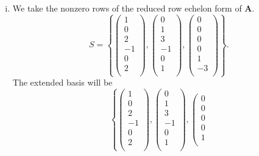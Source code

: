 \documentclass{article}
\newcommand{\bs}[1]{\boldsymbol{#1}}
\begin{document}
\begin{enumerate}[(i)]
    \item We take the nonzero rows of the reduced row echelon form of $\bs{A}$. 
    $$S = \left\{ 
    \left(\begin{array}{c}
    1 \\
    0 \\
    2 \\
    -1 \\
    0 \\
    2 \\
    \end{array}\right), \left(\begin{array}{c}
    0 \\
    1 \\
    3 \\
    -1 \\
    0 \\
    1 \\
    \end{array}\right),
    \left(\begin{array}{c}
    0 \\
    0 \\
    0 \\
    0 \\
    1 \\
    -3 \\
    \end{array}\right)
    \right\}.$$
    The extended basis will be 
    $$\left\{ 
    \left(\begin{array}{c}
    1 \\
    0 \\
    2 \\
    -1 \\
    0 \\
    2 \\
    \end{array}\right), \left(\begin{array}{c}
    0 \\
    1 \\
    3 \\
    -1 \\
    0 \\
    1 \\
    \end{array}\right),
    \left(\begin{array}{c}
    0 \\
    0 \\
    0 \\
    0 \\
    1 \\

\end{array}$$
\end{enumerate}
\end{document}
